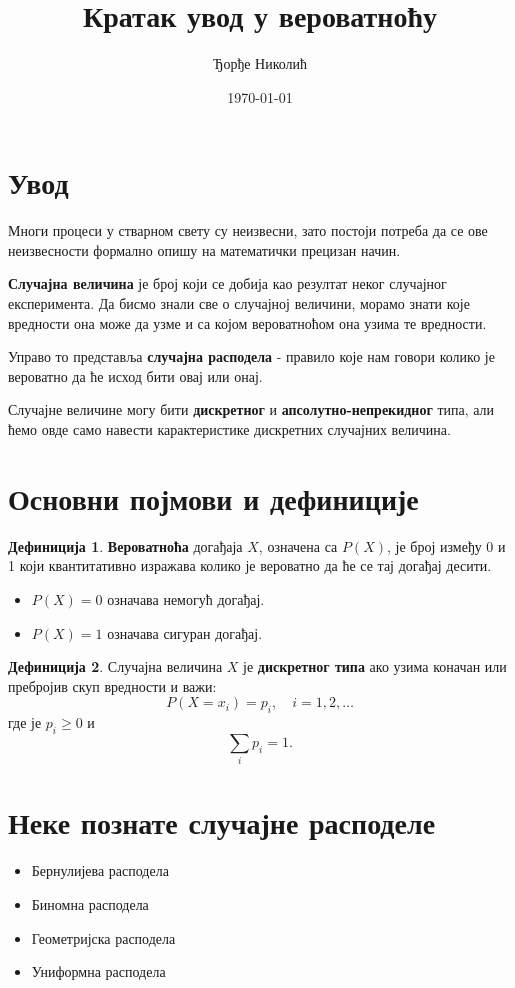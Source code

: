 \documentclass[12pt]{article}
\title{\textbf{Кратак увод у вероватноћу}}
\author{Ђорђе Николић}
\date{\today}
\theoremstyle{definition}
\newtheorem{definition}{Дефиниција}
\begin{document}
\setlength{\droptitle}{-2.0cm}

\maketitle

\section{Увод}
Многи процеси у стварном свету су неизвесни, зато постоји потреба да се 
ове неизвесности формално опишу на математички прецизан начин.

\textbf{Случајна величина} је број који се добија као резултат неког случајног експеримента.
Да бисмо знали све о случајној величини, морамо знати које вредности она може да узме и са којом вероватноћом она узима те вредности.

Управо то представља \textbf{случајна расподела} - правило које нам говори колико је вероватно да ће исход бити овај или онај.

Случајне величине могу бити \textbf{дискретног} и \textbf{апсолутно-непрекидног} типа, али ћемо овде само навести карактеристике дискретних случајних величина.

\section{Основни појмови и дефиниције}

\begin{definition}
\textbf{Вероватноћа} догађаја \(X\), означена са \(P(X)\), је број између 0 и 1 који квантитативно изражава колико је вероватно да ће се тај догађај десити. 
\begin{itemize}
    \item \(P(X) = 0\) означава немогућ догађај.
    \item \(P(X) = 1\) означава сигуран догађај.
\end{itemize}

\end{definition}
\begin{definition}
Случајна величина \(X\) је \textbf{дискретног типа} ако узима коначан или пребројив скуп вредности и важи:
\[
P(X = x_i) = p_i, \quad i = 1, 2, \dots
\]
где је \(p_i \ge 0\) и
\[
\sum_{i} p_i = 1.
\]

\end{definition}

\section{Неке познате случајне расподеле}
\begin{itemize}
\item Бернулијева расподела
\item Биномна расподела
\item Геометријска расподела
\item Униформна расподела

\end{itemize}
\end{document}
